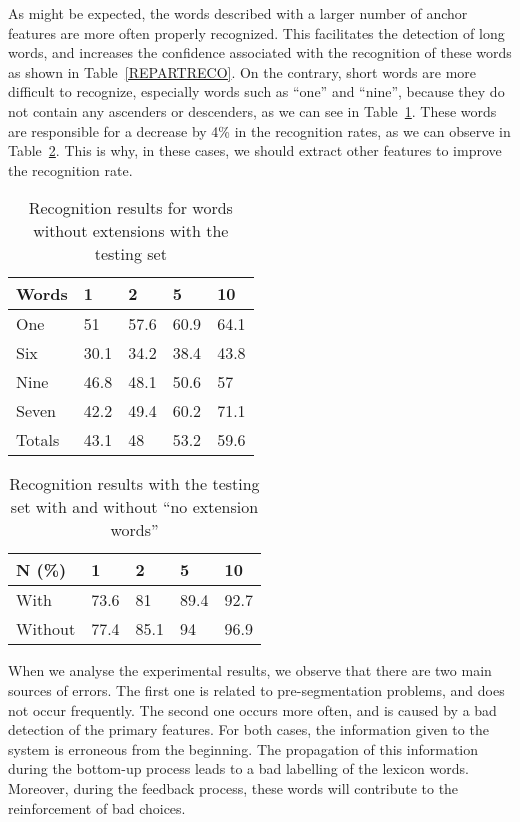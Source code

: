 \documentclass[ijdar]{svjour}
\begin{document}
As might be expected, the words described with a larger number of anchor
features are more often properly recognized. This facilitates the
detection of long words, and increases the confidence associated with
the recognition of these words as shown in Table~\ref{REPARTRECO}. On
the contrary, short words are more difficult to recognize, especially
words such as ``one'' and ``nine'', because they do not contain any
ascenders or descenders, as we can see in Table~\ref{RECOSANSEXT}. These
words are responsible for a decrease by 4\% in the recognition rates, as
we can observe in Table~\ref{RECOAVECSANS}. This is why, in these cases,
we should extract other features to improve the recognition rate.


\begin{table}%
\caption{Recognition results for words without extensions with the testing set}
\label{RECOSANSEXT}
\begin{tabular}{l l l l l }
\hline
Words           &1      &2      &5      &10\\
\hline
One             &51     &57.6   &60.9   &64.1\\
Six             &30.1   &34.2   &38.4   &43.8\\
Nine            &46.8   &48.1   &50.6   &57\\
Seven           &42.2   &49.4   &60.2   &71.1\\
\hline
Totals          &43.1   &48     &53.2   &59.6\\
\hline
\end{tabular}
\end{table}

\begin{table}%
\caption{Recognition results with the testing set with and without ``no extension words''}
\label{RECOAVECSANS}
\begin{tabular}{l l l l l }
\hline
N (\%)          &1      &2      &5      &10     \\
\hline
With            &73.6   &81     &89.4   &92.7   \\
Without         &77.4   &85.1   &94     &96.9   \\
\hline
\end{tabular}
\end{table}




When we analyse the experimental results, we observe that there are two main sources of errors.
The first one is related to pre-segmentation problems, and does not occur frequently.
The second one occurs more often, and is caused by a bad detection of the primary features.
For both cases, the information given to the system is erroneous from the beginning.
The propagation of this information during the bottom-up process leads to a bad labelling of the lexicon words.
Moreover, during the feedback process, these words will contribute to the reinforcement of bad choices.
\end{document}
